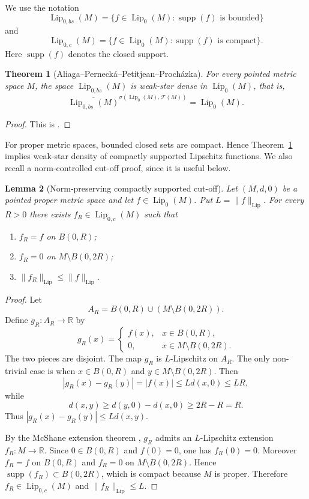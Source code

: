 \documentclass[11pt]{amsart}
\theoremstyle{plain}
\newtheorem{theorem}{Theorem}[section]
\newtheorem{lemma}[theorem]{Lemma}
\theoremstyle{definition}
\theoremstyle{remark}
\newcommand{\Lip}{\operatorname{Lip}}
\newcommand{\supp}{\operatorname{supp}}
\newcommand{\F}{\mathcal F}
\newcommand{\R}{\mathbb R}
\begin{document}
We use the notation
\[
        \Lip_{0,bs}(M)=\{f\in\Lip_0(M):\supp(f)\text{ is bounded}\}
\]
and
\[
        \Lip_{0,c}(M)=\{f\in\Lip_0(M):\supp(f)\text{ is compact}\}.
\]
Here $\supp(f)$ denotes the closed support.

\begin{theorem}[Aliaga--Perneck\'a--Petitjean--Proch\'azka]
\label{thm:APPP}
For every pointed metric space $M$, the space $\Lip_{0,bs}(M)$ is weak-star
dense in $\Lip_0(M)$, that is,
\[
        \overline{\Lip_{0,bs}(M)}^{\sigma(\Lip_0(M),\F(M))}=\Lip_0(M).
\]
\end{theorem}

\begin{proof}
This is \cite[Lemma 2.2]{APPP20}.
\end{proof}

For proper metric spaces, bounded closed sets are compact. Hence
Theorem~\ref{thm:APPP} implies weak-star density of compactly supported
Lipschitz functions. We also recall a norm-controlled cut-off proof, since
it is useful below.

\begin{lemma}[Norm-preserving compactly supported cut-off]
\label{lem:cutoff}
Let $(M,d,0)$ be a pointed proper metric space and let $f\in\Lip_0(M)$.
Put $L=\|f\|_{\Lip}$. For every $R>0$ there exists
$f_R\in\Lip_{0,c}(M)$ such that
\begin{enumerate}[label=\textup{(\arabic*)}]
\item $f_R=f$ on $B(0,R)$;
\item $f_R=0$ on $M\setminus B(0,2R)$;
\item $\|f_R\|_{\Lip}\le \|f\|_{\Lip}$.
\end{enumerate}
\end{lemma}

\begin{proof}
Let
\[
        A_R=B(0,R)\cup (M\setminus B(0,2R)).
\]
Define $g_R:A_R\to\R$ by
\[
        g_R(x)=
        \begin{cases}
        f(x),& x\in B(0,R),\\
        0,& x\in M\setminus B(0,2R).
        \end{cases}
\]
The two pieces are disjoint. The map $g_R$ is $L$-Lipschitz on $A_R$. The
only non-trivial case is when $x\in B(0,R)$ and $y\in M\setminus B(0,2R)$.
Then
\[
        |g_R(x)-g_R(y)|=|f(x)|\le Ld(x,0)\le LR,
\]
while
\[
        d(x,y)\ge d(y,0)-d(x,0)\ge 2R-R=R.
\]
Thus $|g_R(x)-g_R(y)|\le Ld(x,y)$.

By the McShane extension theorem \cite{McS34}, $g_R$ admits an
$L$-Lipschitz extension $f_R:M\to\R$. Since $0\in B(0,R)$ and $f(0)=0$, one
has $f_R(0)=0$. Moreover $f_R=f$ on $B(0,R)$ and $f_R=0$ on
$M\setminus B(0,2R)$. Hence $\supp(f_R)\subset B(0,2R)$, which is compact
because $M$ is proper. Therefore $f_R\in\Lip_{0,c}(M)$ and
$\|f_R\|_{\Lip}\le L$.
\end{proof}
\end{document}
